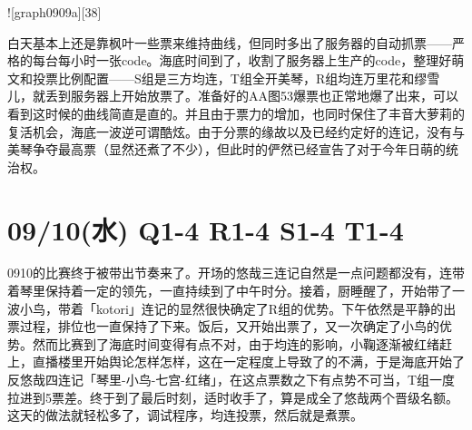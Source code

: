 ![graph0909a][38]

白天基本上还是靠枫叶一些票来维持曲线，但同时多出了服务器的自动抓票——严格的每台每小时一张code。海底时间到了，收割了服务器上生产的code，整理好萌文和投票比例配置——S组是三方均连，T组全开美琴，R组均连万里花和缪雪儿，就丢到服务器上开始放票了。准备好的AA图53爆票也正常地爆了出来，可以看到这时候的曲线简直是直的。并且由于票力的增加，也同时保住了丰音大萝莉的复活机会，海底一波逆可谓酷炫。由于分票的缘故以及已经约定好的连记，没有与美琴争夺最高票（显然还煮了不少），但此时的俨然已经宣告了对于今年日萌的统治权。

\section{09/10(水) Q1-4 R1-4 S1-4 T1-4}


0910的比赛终于被带出节奏来了。开场的悠哉三连记自然是一点问题都没有，连带着琴里保持着一定的领先，一直持续到了中午时分。接着，厨睡醒了，开始带了一波小鸟，带着「kotori」连记的显然很快确定了R组的优势。下午依然是平静的出票过程，排位也一直保持了下来。饭后，又开始出票了，又一次确定了小鸟的优势。然而比赛到了海底时间变得有点不对，由于均连的影响，小鞠逐渐被红绪赶上，直播楼里开始舆论怎样怎样，这在一定程度上导致了的不满，于是海底开始了反悠哉四连记「琴里-小鸟-七宫-红绪」，在这点票数之下有点势不可当，T组一度拉进到5票差。终于到了最后时刻，适时收手了，算是成全了悠哉两个晋级名额。
这天的做法就轻松多了，调试程序，均连投票，然后就是煮票。


